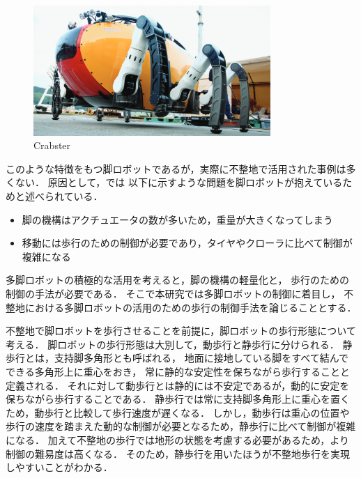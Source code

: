 \begin{figure}[htbp]
  \begin{center}
    \includegraphics[width=90mm, clip]{figure/chapter1/crabster.png}
    \caption{Crabster}
    \label{fig:crabster} %
  \end{center}
\end{figure}

このような特徴をもつ脚ロボットであるが，実際に不整地で活用された事例は多くない．
原因として，\cite{Locomotion_for_difficult_terrain}では
以下に示すような問題を脚ロボットが抱えているためと述べられている．

\begin{itemize}
  \item 脚の機構はアクチュエータの数が多いため，重量が大きくなってしまう
  \item 移動には歩行のための制御が必要であり，タイヤやクローラに比べて制御が複雑になる
\end{itemize}

多脚ロボットの積極的な活用を考えると，脚の機構の軽量化と，
歩行のための制御の手法が必要である．
そこで本研究では多脚ロボットの制御に着目し，
不整地における多脚ロボットの活用のための歩行の制御手法を論じることとする．

不整地で脚ロボットを歩行させることを前提に，脚ロボットの歩行形態について考える．
脚ロボットの歩行形態は大別して，動歩行と静歩行に分けられる．
静歩行とは，支持脚多角形とも呼ばれる，
地面に接地している脚をすべて結んでできる多角形上に重心をおき，
常に静的な安定性を保ちながら歩行することと定義される\cite{Hirose_Static_stability_criterion}．
それに対して動歩行とは静的には不安定であるが，動的に安定を保ちながら歩行することである．
静歩行では常に支持脚多角形上に重心を置くため，動歩行と比較して歩行速度が遅くなる．
しかし，動歩行は重心の位置や歩行の速度を踏まえた動的な制御が必要となるため，静歩行に比べて制御が複雑になる．
加えて不整地の歩行では地形の状態を考慮する必要があるため，より制御の難易度は高くなる．
そのため，静歩行を用いたほうが不整地歩行を実現しやすいことがわかる．

